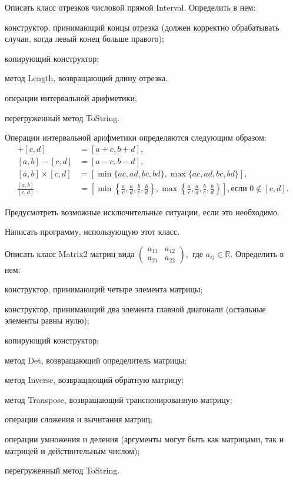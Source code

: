 \task Описать класс отрезков числовой прямой Interval. Определить в нем:
\begin{itemize*}
\item конструктор, принимающий концы отрезка (должен корректно
  обрабатывать случаи, когда левый конец больше правого);
\item копирующий конструктор;
\item метод Length, возвращающий длину отрезка.
\item операции интервальной арифметики;
\item перегруженный метод ToString.
\end{itemize*}

Операции интервальной арифметики определяются следующим образом:
\begin{align*}
  [a, b] + [c, d] &= [a + c, b + d],\\
  [a, b] - [c, d] &= [a - c, b - d],\\
  [a, b] \times [c, d] &=
  [\min \{ac, ad, bc, bd\}, \max \{ac, ad, bc, bd\}],\\
  \frac{[a, b]}{[c, d]} &=
  \left[
    \min \left\{\frac{a}{c}, \frac{a}{d}, \frac{b}{c}, \frac{b}{d}\right\},
    \max \left\{\frac{a}{c}, \frac{a}{d}, \frac{b}{c}, \frac{b}{d}\right\}
    \right], \textrm{если } 0\not\in[c, d].
\end{align*}

Предусмотреть возможные исключительные ситуации, если это необходимо.

Написать программу, использующую этот класс.

\task Описать класс Matrix2 матриц вида
$\begin{pmatrix}
a_{11} & a_{12} \\
a_{21} & a_{22}
\end{pmatrix},$ где $a_{ij} \in \mathbb{R}$. Определить в нем:
\begin{itemize*}
\item конструктор, принимающий четыре элемента матрицы;
\item конструктор, принимающий два элемента главной диагонали
  (остальные элементы равны нулю);
\item копирующий конструктор;
\item метод Det, возвращающий определитель матрицы;
\item метод Inverse, возвращающий обратную матрицу;
\item метод Transpose, возвращающий транспонированную матрицу;
\item операции сложения и вычитания матриц;
\item операции умножения и деления (аргументы могут быть как матрицами,
  так и матрицей и действительным числом);
\item перегруженный метод ToString.
\end{itemize*}

